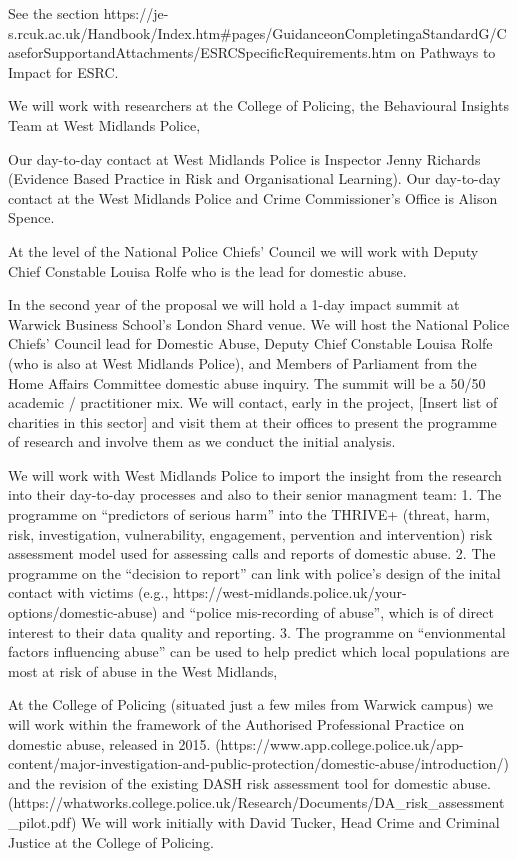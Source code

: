 See the section https://je-s.rcuk.ac.uk/Handbook/Index.htm#pages/GuidanceonCompletingaStandardG/CaseforSupportandAttachments/ESRCSpecificRequirements.htm on Pathways to Impact for ESRC.



We will work with researchers at the College of Policing, the Behavioural Insights Team at West Midlands Police, 

Our day-to-day contact at West Midlands Police is Inspector Jenny Richards (Evidence Based Practice in Risk and Organisational Learning). Our day-to-day contact at the West Midlands Police and Crime Commissioner's Office is Alison Spence. 

At the level of the National Police Chiefs' Council we will work with Deputy Chief Constable Louisa Rolfe who is the lead for domestic abuse. 



In the second year of the proposal we will hold a 1-day impact summit at Warwick Business School's London Shard venue. We will host the National Police Chiefs' Council lead for Domestic Abuse, Deputy Chief Constable Louisa Rolfe (who is also at West Midlands Police), and Members of Parliament from the Home Affairs Committee domestic abuse inquiry. The summit will be a 50/50 academic / practitioner mix. We will contact, early in the project, [Insert list of charities in this sector] and visit them at their offices to present the programme of research and involve them as we conduct the initial analysis.

We will work with West Midlands Police to import the insight from the research into their day-to-day processes and also to their senior managment team: 1. The programme on ``predictors of serious harm'' into the THRIVE+ (threat, harm, risk, investigation, vulnerability, engagement, pervention and intervention) risk assessment model used for assessing calls and reports of domestic abuse. 2. The programme on the  ``decision to report'' can link with police's design of the inital contact with victims (e.g., https://west-midlands.police.uk/your-options/domestic-abuse) and ``police mis-recording of abuse'', which is of direct interest to their data quality and reporting. 3. The programme on ``envionmental factors influencing abuse'' can be used to help predict which local populations are most at risk of abuse in the West Midlands, 

At the College of Policing (situated just a few miles from Warwick campus) we will work within the framework of the Authorised Professional Practice on domestic abuse, released in 2015. (https://www.app.college.police.uk/app-content/major-investigation-and-public-protection/domestic-abuse/introduction/) and the revision of the existing DASH risk assessment tool for domestic abuse. (https://whatworks.college.police.uk/Research/Documents/DA_risk_assessment_pilot.pdf) We will work initially with David Tucker, Head Crime and Criminal Justice at the College of Policing.

